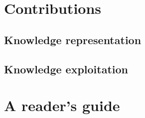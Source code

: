 \section{Contributions}

\subsection{Knowledge representation}

\subsection{Knowledge exploitation}

\section{A reader's guide}


